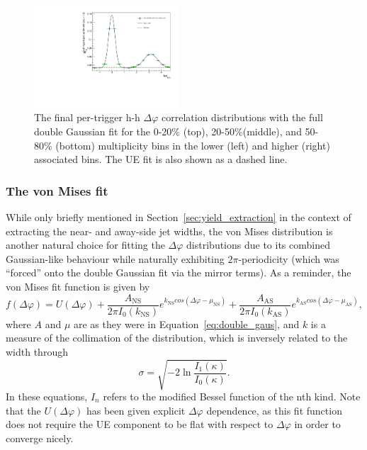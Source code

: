 \begin{figure}[ht]
    \includegraphics[width=0.48\textwidth]{figures/analysis/h_h_dphi_gaus_50_80_highpt.pdf}
    \caption{The final per-trigger h-h $\Delta\varphi$ correlation distributions with the full double Gaussian fit for the 0-20\% (top), 20-50\%(middle), and 50-80\% (bottom) multiplicity bins in the lower (left) and higher (right) associated \pt bins. The UE fit is also shown as a dashed line.}
    \label{fig:double_gaus_fits_h}
\end{figure}

\clearpage

\subsubsection{The von Mises fit}
\label{sec:von_mises_fit}

While only briefly mentioned in Section~\ref{sec:yield_extraction} in the context of extracting the near- and away-side jet widths, the von Mises distribution is another natural choice for fitting the $\Delta\varphi$ distributions due to its combined Gaussian-like behaviour while naturally exhibiting $2\pi$-periodicity (which was ``forced'' onto the double Gaussian fit via the mirror terms). As a reminder, the von Mises fit function is given by
%
\begin{equation}
    \label{eq:von_mises}
    f(\Delta\varphi) = U(\Delta\varphi) + \frac{A_{\text{NS}}}{2\pi I_0(k_{\text{NS}})} e^{k_{\text{NS}}cos(\Delta\varphi - \mu_{\text{NS}})} + \frac{A_{\text{AS}}}{2\pi I_0(k_{\text{AS}})} e^{k_{\text{AS}}cos(\Delta\varphi - \mu_{\text{AS}})},
\end{equation}
%
where $A$ and $\mu$ are as they were in Equation~\ref{eq:double_gaus}, and $k$ is a measure of the collimation of the distribution, which is inversely related to the width through
%
\begin{equation}
    \label{eq:kappa_to_sigma}
    \sigma = \sqrt{-2\ln\frac{I_{1}(\kappa)}{I_{0}(\kappa)}}.
\end{equation}
%
In these equations, $I_n$ refers to the modified Bessel function of the nth kind. Note that the $U(\Delta\varphi)$ has been given explicit $\Delta\varphi$ dependence, as this fit function does not require the UE component to be flat with respect to $\Delta\varphi$ in order to converge nicely.

